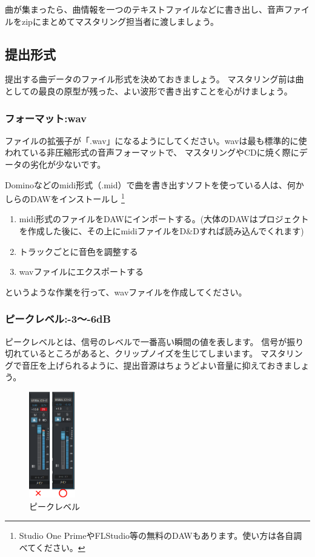 \documentclass[11pt,a4paper]{jsarticle}
\begin{document}
            曲が集まったら、曲情報を一つのテキストファイルなどに書き出し、音声ファイルをzipにまとめてマスタリング担当者に渡しましょう。
        
        \subsection{提出形式}
            提出する曲データのファイル形式を決めておきましょう。
            マスタリング前は曲としての最良の原型が残った、よい波形で書き出すことを心がけましょう。

            \subsubsection{フォーマット:wav}
                ファイルの拡張子が「.wav」になるようにしてください。wavは最も標準的に使われている非圧縮形式の音声フォーマットで、
                マスタリングやCDに焼く際にデータの劣化が少ないです。

                Dominoなどのmidi形式（.mid）で曲を書き出すソフトを使っている人は、何かしらのDAWをインストールし
                \footnote{Studio One PrimeやFLStudio等の無料のDAWもあります。使い方は各自調べてください。}
                \begin{enumerate}
                    \item midi形式のファイルをDAWにインポートする。(大体のDAWはプロジェクトを作成した後に、その上にmidiファイルをD\&Dすれば読み込んでくれます)
                    \item トラックごとに音色を調整する
                    \item wavファイルにエクスポートする
                \end{enumerate}
                というような作業を行って、wavファイルを作成してください。

            \subsubsection{ピークレベル:-3～-6dB}
                ピークレベルとは、信号のレベルで一番高い瞬間の値を表します。
                信号が振り切れているところがあると、クリップノイズを生じてしまいます。
                マスタリングで音圧を上げられるように、提出音源はちょうどよい音量に抑えておきましょう。
                \begin{figure}[htbp]
                    \begin{center}
                    \includegraphics[width=2.0cm]{./image/format01.eps}
                    \caption{ピークレベル}
                    \label{fig:format01}
                    \end{center}
                \end{figure}
\end{document}
